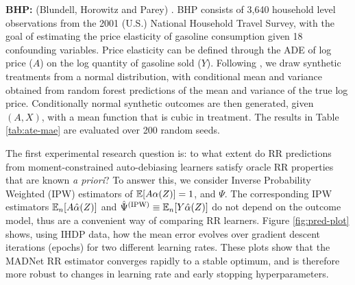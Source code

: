 \textbf{BHP:} (Blundell, Horowitz and Parey) \citep{Blundell2017}. BHP consists of 3,640 household level observations from the 2001 (U.S.) National Household Travel Survey, with the goal of estimating the price elasticity of gasoline consumption given 18 confounding variables. Price elasticity can be defined through the ADE of log price ($A$) on the log quantity of gasoline sold ($Y$). Following \citep{Chernozhukov2022}, we draw synthetic treatments from a normal distribution, with conditional mean and variance obtained from random forest predictions of the mean and variance of the true log price. Conditionally normal synthetic outcomes are then generated, given $(A,X)$, with a mean function that is cubic in treatment. The results in Table \ref{tab:ate-mae} are evaluated over 200 random seeds.


The first experimental research question is: to what extent do RR predictions from moment-constrained auto-debiasing learners satisfy oracle RR properties that are known \emph{a priori}? To answer this, we consider Inverse Probability Weighted (IPW) estimators of $\mathbb{E}[A\alpha(Z)] = 1$, and $\Psi$. The corresponding IPW estimators $\mathbb{E}_n[A\hat{\alpha}(Z)]$ and $\hat{\Psi}^{(\text{IPW})} \equiv \mathbb{E}_n[Y\hat{\alpha}(Z)]$ do not depend on the outcome model, thus are a convenient way of comparing RR learners. Figure \ref{fig:pred-plot} shows, using IHDP data, how the mean error evolves over gradient descent iterations (epochs) for two different learning rates. These plots show that the MADNet RR estimator converges rapidly to a stable optimum, and is therefore more robust to changes in learning rate and early stopping hyperparameters.

